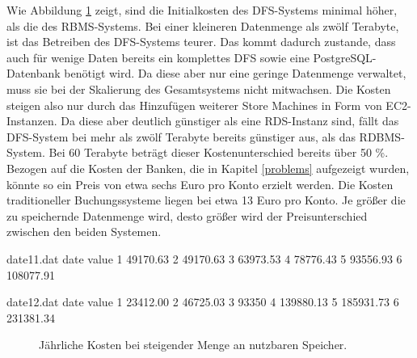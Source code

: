 \documentclass[12pt,oneside,a4paper,parskip]{scrbook}
\begin{document}
Wie Abbildung \ref{costsAmazon} zeigt, sind die Initialkosten des DFS-Systems minimal höher, als die des RBMS-Systems. Bei einer kleineren Datenmenge als zwölf Terabyte, ist das Betreiben des DFS-Systems teurer. Das kommt dadurch zustande, dass auch für wenige Daten bereits ein komplettes DFS sowie eine PostgreSQL-Datenbank benötigt wird. Da diese aber nur eine geringe Datenmenge verwaltet, muss sie bei der Skalierung des Gesamtsystems nicht mitwachsen. Die Kosten steigen also nur durch das Hinzufügen weiterer Store Machines in Form von EC2-Instanzen. Da diese aber deutlich günstiger als eine RDS-Instanz sind, fällt das DFS-System bei mehr als zwölf Terabyte bereits günstiger aus, als das RDBMS-System. Bei 60 Terabyte beträgt dieser Kostenunterschied bereits über 50 \%. Bezogen auf die Kosten der Banken, die in Kapitel \ref{problems} aufgezeigt wurden, könnte so ein Preis von etwa sechs Euro pro Konto erzielt werden. Die Kosten traditioneller Buchungssysteme liegen bei etwa 13 Euro pro Konto. Je größer die zu speichernde Datenmenge wird, desto größer wird der Preisunterschied zwischen den beiden Systemen.

\begin{filecontents}{date11.dat}
date  value
1     49170.63
2     49170.63
3     63973.53
4     78776.43
5     93556.93
6     108077.91
\end{filecontents}

\begin{filecontents}{date12.dat}
date  value
1     23412.00
2     46725.03
3     93350
4     139880.13
5     185931.73
6     231381.34
\end{filecontents}



\begin{figure}
\begin{center}
\caption[Jährliche Kosten bei steigender Menge an nutzbaren Speicher]{Jährliche Kosten bei steigender Menge an nutzbaren Speicher.}
\label{costsAmazon}
\end{center}
\end{figure}
\end{document}
